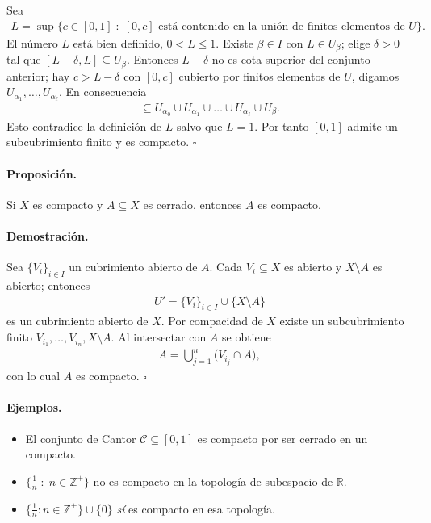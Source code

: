 Sea
\begin{align*}
L=\sup\bigl\{c\in[0,1]\;:\;[0,c]\text{ está contenido en la unión de finitos elementos de }U\bigr\}.
\end{align*}
El número $L$ está bien definido, $0<L\le1$.  
Existe $\beta\in I$ con $L\in U_\beta$; elige $\delta>0$ tal que $[L-\delta,L]\subseteq U_\beta$.  
Entonces $L-\delta$ no es cota superior del conjunto anterior; hay $c>L-\delta$ con $[0,c]$ cubierto por finitos elementos de $U$, digamos $U_{\alpha_1},\dots,U_{\alpha_\ell}$.  
En consecuencia
\begin{align*}
[0,L]\subseteq U_{\alpha_0}\cup U_{\alpha_1}\cup\dots\cup U_{\alpha_\ell}\cup U_\beta.
\end{align*}
Esto contradice la definición de $L$ salvo que $L=1$.  
Por tanto $[0,1]$ admite un subcubrimiento finito y es compacto. \hfill$\square$

\paragraph{\textbf{Proposición.}}
Si $X$ es compacto y $A\subseteq X$ es cerrado, entonces $A$ es compacto.

\paragraph{\textbf{Demostración.}}
Sea $\{V_i\}_{i\in I}$ un cubrimiento abierto de $A$.  
Cada $V_i\subseteq X$ es abierto y $X\setminus A$ es abierto; entonces
\begin{align*}
U'=\bigl\{V_i\bigr\}_{i\in I}\cup\{X\setminus A\}
\end{align*}
es un cubrimiento abierto de $X$.  
Por compacidad de $X$ existe un subcubrimiento finito $V_{i_1},\dots,V_{i_n},X\setminus A$.  
Al intersectar con $A$ se obtiene
\begin{align*}
A=\bigcup_{j=1}^{n}\!\bigl(V_{i_j}\cap A\bigr),
\end{align*}
con lo cual $A$ es compacto. \hfill$\square$

\paragraph{\textbf{Ejemplos.}}
\begin{itemize}
  \item[a)] El conjunto de Cantor $\mathcal C\subseteq[0,1]$ es compacto por ser cerrado en un compacto.
  \item[b)] $\{\tfrac1n\;:\;n\in\mathbb Z^{+}\}$ no es compacto en la topología de subespacio de $\mathbb R$.
  \item[c)] $\{\tfrac1n:n\in\mathbb Z^{+}\}\cup\{0\}$ \emph{sí} es compacto en esa topología.
\end{itemize}


